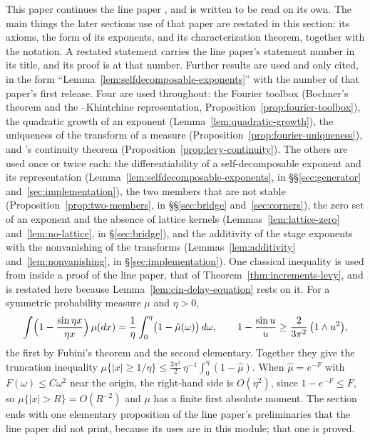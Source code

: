 This paper continues the line paper , and is written to be read
on its own. The main things the later sections use of that paper are restated in this section:
its axioms, the form of its exponents, and its characterization theorem, together with the
notation. A restated statement carries the line paper's statement number in its title, and its
proof is at that number. Further results are used and only cited, in the form
``Lemma~\ref{lem:selfdecomposable-exponents}'' with the number of that paper's first release.
Four are used throughout:
the Fourier toolbox (Bochner's theorem and the \Levy--Khintchine representation,
Proposition~\ref{prop:fourier-toolbox}), the
quadratic growth of an exponent (Lemma~\ref{lem:quadratic-growth}), the uniqueness of the
transform of a measure (Proposition~\ref{prop:fourier-uniqueness}), and \Levy's
continuity theorem (Proposition~\ref{prop:levy-continuity}). The others are used once or twice
each: the differentiability of a self-decomposable exponent and its representation
(Lemma~\ref{lem:selfdecomposable-exponents}, in \S\S\ref{sec:generator}
and~\ref{sec:implementation}), the two members that are not stable
(Proposition~\ref{prop:two-members}, in \S\S\ref{sec:bridge} and~\ref{sec:corners}), the zero
set of an exponent and the absence of lattice kernels (Lemmas~\ref{lem:lattice-zero}
and~\ref{lem:no-lattice}, in \S\ref{sec:bridge}), and the additivity of the stage exponents with
the nonvanishing of the transforms (Lemmas~\ref{lem:additivity} and~\ref{lem:nonvanishing}, in
\S\ref{sec:implementation}). One classical inequality is used from inside a proof of the line
paper, that of Theorem~\ref{thm:increments-levy}, and is restated here because
Lemma~\ref{lem:cin-delay-equation} rests on it. For a symmetric probability measure $\mu$ and
$\eta > 0$,
\begin{equation}\label{eq:truncation-b}
  \int \Bigl(1 - \frac{\sin\eta x}{\eta x}\Bigr)\,\mu(dx)
   = \frac1\eta\int_0^\eta \bigl(1 - \hat\mu(\omega)\bigr)\,d\omega,
  \qquad
  1 - \frac{\sin u}{u} \ge \frac{2}{3\pi^2}\,\bigl(1 \wedge u^2\bigr),
\end{equation}
the first by Fubini's theorem and the second elementary. Together they give the truncation
inequality $\mu\{|x| \ge 1/\eta\} \le \tfrac{3\pi^2}{2}\,\eta^{-1}\int_0^\eta(1 - \hat\mu)$. When
$\hat\mu = e^{-F}$ with $F(\omega) \le C\omega^2$ near the origin, the right-hand side is
$O(\eta^2)$, since $1 - e^{-F} \le F$, so $\mu\{|x| > R\} = O(R^{-2})$ and $\mu$ has a finite
first absolute moment. The section ends with
one elementary proposition of the line paper's preliminaries that the line paper did not
print, because its uses are in this module; that one is proved.

